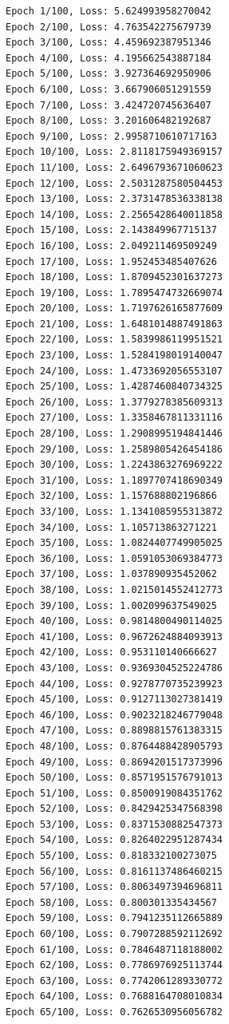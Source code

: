 \documentclass[11pt]{article}
\begin{document}
    \begin{Verbatim}[commandchars=\\\{\}]
Epoch 1/100, Loss: 5.624993958270042
Epoch 2/100, Loss: 4.763542275679739
Epoch 3/100, Loss: 4.459692387951346
Epoch 4/100, Loss: 4.195662543887184
Epoch 5/100, Loss: 3.927364692950906
Epoch 6/100, Loss: 3.667906051291559
Epoch 7/100, Loss: 3.424720745636407
Epoch 8/100, Loss: 3.201606482192687
Epoch 9/100, Loss: 2.9958710610717163
Epoch 10/100, Loss: 2.8118175949369157
Epoch 11/100, Loss: 2.6496793671060623
Epoch 12/100, Loss: 2.5031287580504453
Epoch 13/100, Loss: 2.3731478536338138
Epoch 14/100, Loss: 2.2565428640011858
Epoch 15/100, Loss: 2.143849967715137
Epoch 16/100, Loss: 2.049211469509249
Epoch 17/100, Loss: 1.952453485407626
Epoch 18/100, Loss: 1.8709452301637273
Epoch 19/100, Loss: 1.7895474732669074
Epoch 20/100, Loss: 1.7197626165877609
Epoch 21/100, Loss: 1.6481014887491863
Epoch 22/100, Loss: 1.5839986119951521
Epoch 23/100, Loss: 1.5284198019140047
Epoch 24/100, Loss: 1.4733692056553107
Epoch 25/100, Loss: 1.4287460840734325
Epoch 26/100, Loss: 1.3779278385609313
Epoch 27/100, Loss: 1.3358467811331116
Epoch 28/100, Loss: 1.2908995194841446
Epoch 29/100, Loss: 1.2589805426454186
Epoch 30/100, Loss: 1.2243863276969222
Epoch 31/100, Loss: 1.1897707418690349
Epoch 32/100, Loss: 1.157688802196866
Epoch 33/100, Loss: 1.1341085955313872
Epoch 34/100, Loss: 1.105713863271221
Epoch 35/100, Loss: 1.0824407749905025
Epoch 36/100, Loss: 1.0591053069384773
Epoch 37/100, Loss: 1.037890935452062
Epoch 38/100, Loss: 1.0215014552412773
Epoch 39/100, Loss: 1.002099637549025
Epoch 40/100, Loss: 0.9814800490114025
Epoch 41/100, Loss: 0.9672624884093913
Epoch 42/100, Loss: 0.953110140666627
Epoch 43/100, Loss: 0.9369304525224786
Epoch 44/100, Loss: 0.9278770735239923
Epoch 45/100, Loss: 0.9127113027381419
Epoch 46/100, Loss: 0.9023218246779048
Epoch 47/100, Loss: 0.8898815761383315
Epoch 48/100, Loss: 0.8764488428905793
Epoch 49/100, Loss: 0.8694201517373996
Epoch 50/100, Loss: 0.8571951576791013
Epoch 51/100, Loss: 0.8500919084351762
Epoch 52/100, Loss: 0.8429425347568398
Epoch 53/100, Loss: 0.8371530882547373
Epoch 54/100, Loss: 0.8264022951287434
Epoch 55/100, Loss: 0.818332100273075
Epoch 56/100, Loss: 0.8161137486460215
Epoch 57/100, Loss: 0.8063497394696811
Epoch 58/100, Loss: 0.800301335434567
Epoch 59/100, Loss: 0.7941235112665889
Epoch 60/100, Loss: 0.7907288592112692
Epoch 61/100, Loss: 0.7846487118188002
Epoch 62/100, Loss: 0.7786976925113744
Epoch 63/100, Loss: 0.7742061289330772
Epoch 64/100, Loss: 0.7688164708010834
Epoch 65/100, Loss: 0.7626530956056782

\end{Verbatim}
\end{document}
